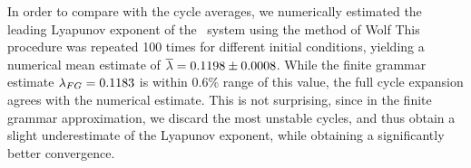 In order to compare with the cycle averages, we numerically estimated the
leading Lyapunov exponent of the \twomode\ system using the method of
Wolf \etal{} This procedure was repeated 100 times for
different initial conditions, yielding a numerical mean estimate of
$\overline{\lambda} = 0.1198 \pm 0.0008$. While the finite grammar
estimate $\lambda_{FG} = 0.1183$ is within $0.6\%$ range of this value,
the full cycle expansion agrees with the numerical estimate. This is not
surprising, since in the finite grammar approximation, we discard the
most unstable cycles, and thus obtain a slight underestimate of the Lyapunov
exponent, while obtaining a significantly better convergence.


\renewcommand{\zeit}{\ensuremath{\tau}}  %
